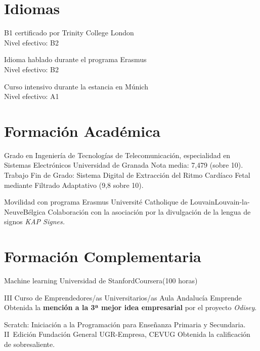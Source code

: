 \documentclass[11pt,a4paper,sans,spanish]{moderncv}
\begin{document}
\section{Idiomas}


{B1 certificado por Trinity College London\\Nivel efectivo: B2}

{Idioma hablado durante el programa Erasmus\\Nivel efectivo: B2}

{Curso intensivo durante la estancia en Múnich\\Nivel efectivo: A1} 


\section{Formación Académica}

{Grado en Ingeniería de Tecnologías de Telecomunicación, especialidad en Sistemas Electrónicos}
{Universidad de Granada}{}{}
{Nota media: 7,479 (sobre 10). 
Trabajo Fin de Grado: 
Sistema Digital de Extracción del Ritmo Cardíaco Fetal mediante Filtrado Adaptativo (9,8 sobre 10).}

{Movilidad con programa Erasmus}
{Université Catholique de Louvain}{Louvain-la-Neuve}{Bélgica}
{Colaboración con la asociación por la divulgación de la lengua de signos \emph{KAP Signes.}}


\section{Formación Complementaria}

{Machine learning}
{Universidad de Stanford}{Coursera}{(100 horas)}
{}

{III Curso de Emprendedores/as Universitarios/as}
{Aula Andalucía Emprende}{}{}
{Obtenida la \textbf{mención a la 3ª mejor idea empresarial} por el proyecto \emph{Odisey}. }

{Scratch: Iniciación a la Programación para Enseñanza Primaria y Secundaria. II~Edición}
{Fundación General UGR-Empresa, CEVUG}{}{}
{Obtenida la calificación de sobresaliente.}
\end{document}
